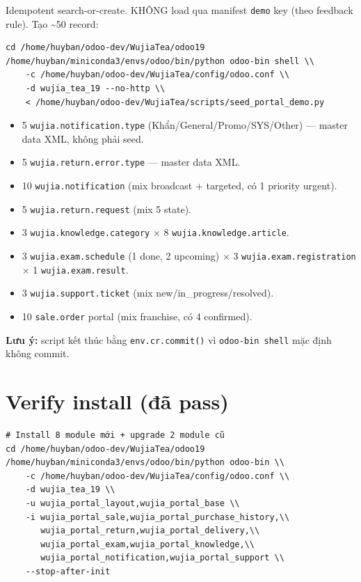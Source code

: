 Idempotent search-or-create. KHÔNG load qua manifest \texttt{demo} key (theo feedback rule). Tạo \textasciitilde 50 record:

\begin{lstlisting}[style=shell]
cd /home/huyban/odoo-dev/WujiaTea/odoo19
/home/huyban/miniconda3/envs/odoo/bin/python odoo-bin shell \\
    -c /home/huyban/odoo-dev/WujiaTea/config/odoo.conf \\
    -d wujia_tea_19 --no-http \\
    < /home/huyban/odoo-dev/WujiaTea/scripts/seed_portal_demo.py
\end{lstlisting}

\begin{itemize}
    \item 5 \texttt{wujia.notification.type} (Khẩn/General/Promo/SYS/Other) --- master data XML, không phải seed.
    \item 5 \texttt{wujia.return.error.type} --- master data XML.
    \item 10 \texttt{wujia.notification} (mix broadcast + targeted, có 1 priority urgent).
    \item 5 \texttt{wujia.return.request} (mix 5 state).
    \item 3 \texttt{wujia.knowledge.category} × 8 \texttt{wujia.knowledge.article}.
    \item 3 \texttt{wujia.exam.schedule} (1 done, 2 upcoming) × 3 \texttt{wujia.exam.registration} × 1 \texttt{wujia.exam.result}.
    \item 3 \texttt{wujia.support.ticket} (mix new/in\_progress/resolved).
    \item 10 \texttt{sale.order} portal (mix franchise, có 4 confirmed).
\end{itemize}

\textbf{Lưu ý:} script kết thúc bằng \texttt{env.cr.commit()} vì \texttt{odoo-bin shell} mặc định không commit.

\section{Verify install (đã pass)}

\begin{lstlisting}[style=shell]
# Install 8 module mới + upgrade 2 module cũ
cd /home/huyban/odoo-dev/WujiaTea/odoo19
/home/huyban/miniconda3/envs/odoo/bin/python odoo-bin \\
    -c /home/huyban/odoo-dev/WujiaTea/config/odoo.conf \\
    -d wujia_tea_19 \\
    -u wujia_portal_layout,wujia_portal_base \\
    -i wujia_portal_sale,wujia_portal_purchase_history,\\
       wujia_portal_return,wujia_portal_delivery,\\
       wujia_portal_exam,wujia_portal_knowledge,\\
       wujia_portal_notification,wujia_portal_support \\
    --stop-after-init
\end{lstlisting}

